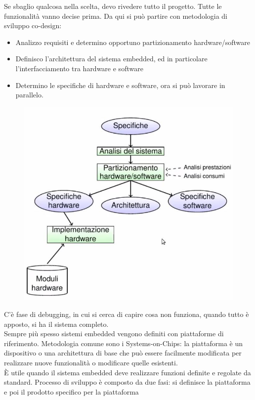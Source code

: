 \documentclass[12pt, oneside]{extbook}
\begin{document}
Se sbaglio qualcosa nella scelta, devo rivedere tutto il progetto. Tutte le funzionalità vanno decise prima. Da qui si può partire con metodologia di sviluppo co-design:
\begin{itemize}
\item Analizzo requisiti e determino opportuno partizionamento hardware/software
\item Definisco l'architettura del sistema embedded, ed in particolare l'interfacciamento tra hardware e software
\item Determino le specifiche di hardware e software, ora si può lavorare in parallelo.
\end{itemize}
\begin{figure}[!h]
\centering
\includegraphics[scale=0.4]{immagini/image-045.jpg}
\end{figure}
C'è fase di debugging, in cui si cerca di capire cosa non funziona, quando tutto è apposto, si ha il sistema completo.\\ Sempre più spesso sistemi embedded vengono definiti con piattaforme di riferimento. Metodologia comune sono i Systems-on-Chips: la piattaforma è un dispositivo o una architettura di base che può essere facilmente modificata per realizzare nuove funzionalità o modificare quelle esistenti.\\ È utile quando il sistema embedded deve realizzare funzioni definite e regolate da standard. Processo di sviluppo è composto da due fasi: si definisce la piattaforma e poi il prodotto specifico per la piattaforma\\
\end{document}
